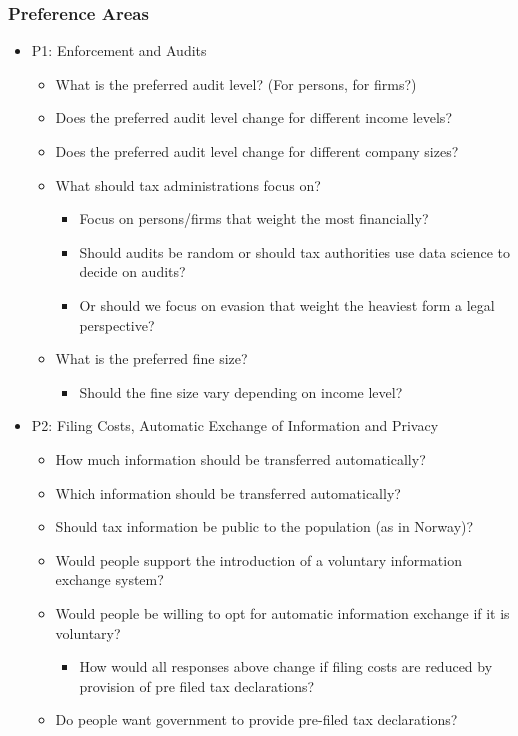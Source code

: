 \documentclass[a4paper, 12pt]{article}
\begin{document}
\subsubsection{Preference Areas}
\begin{itemize}
    \item P1: Enforcement and Audits
    \begin{itemize}
        \item What is the preferred audit level? (For persons, for firms?)
        \item Does the preferred audit level change for different income levels?
        \item Does the preferred audit level change for different company sizes? 
        \item What should tax administrations focus on?
        \begin{itemize}
            \item Focus on persons/firms that weight the most financially?
            \item Should audits be random or should tax authorities use data science to decide on audits?
            \item Or should we focus on evasion that weight the heaviest form a legal perspective?
        \end{itemize}
        \item What is the preferred fine size? 
        \begin{itemize}
            \item Should the fine size vary depending on income level?
        \end{itemize}
    \end{itemize}
    \item P2: Filing Costs, Automatic Exchange of Information and Privacy
    \begin{itemize}
        \item How much information should be transferred automatically? 
        \item Which information should be transferred automatically? 
        \item Should tax information be public to the population (as in Norway)?
        \item Would people support the introduction of a voluntary information exchange system?
        \item Would people be willing to opt for automatic information exchange if it is voluntary?
        \begin{itemize}
            \item How would all responses above change if filing costs are reduced by provision of pre filed tax declarations?
        \end{itemize}
        \item Do people want government to provide pre-filed tax declarations?
    \end{itemize}
\end{itemize}
\end{document}
